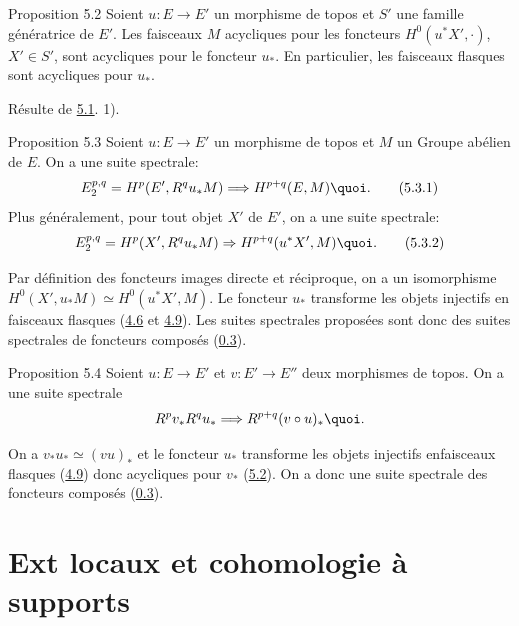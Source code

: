 \begin{enonce*}{Proposition 5.2}
Soient $u : E \to E'$ un morphisme de topos et $S'$ une famille
génératrice de $E'$. Les faisceaux $M$ acycliques pour les
foncteurs $H^{0}(u^\ast X', ⋅)$, $X' \in S'$, sont acycliques pour le
foncteur $u_\ast$. En particulier, les faisceaux flasques sont acycliques
pour $u_\ast$.
\end{enonce*}

Résulte de \hyperref[V.prop5.1]{5.1}. 1).

\begin{enonce*}{Proposition 5.3}
Soient $u : E \to E'$ un morphisme de topos et $M$ un Groupe abélien
de $E$. On a une suite spectrale:
\begin{equation*}
E^{p, q}_2 = H^p(E', R^q u_\ast M) \Longrightarrow H^{p + q} (E,
M){\quoi}.\tag{5.3.1}
\end{equation*}
Plus généralement, pour tout objet $X'$ de $E'$, on a une suite
spectrale:
\begin{equation}
E^{p, q}_2 = H^p(X', R^q u_\ast M) \Rightarrow H^{p + q} (u^\ast X',
M){\quoi}.\tag{5.3.2}
\end{equation}
\end{enonce*}

Par définition des foncteurs images directe et réciproque, on a un
isomorphisme $H^{0} (X', u_\ast M) \simeq H^{0} (u^\ast X', M)$. Le
foncteur $u_\ast$ transforme les objets injectifs en faisceaux flasques
(\hyperref[V.subsec4.6]{4.6} et \hyperref[V.prop4.9]{4.9}). Les suites spectrales proposées sont donc des suites
spectrales de foncteurs composés (\hyperref[V.prop0.3]{0.3}).

\begin{enonce*}{Proposition 5.4}
Soient $u : E \to E'$ et $v : E' \to E''$ deux morphismes de
topos. On a une suite spectrale
$$
R^p v_\ast R^q u_\ast \Longrightarrow R^{p+q} (v \circ u)_\ast {\quoi}.
$$
\end{enonce*}

On a $v_\ast u_\ast \simeq (vu)_\ast$ et le foncteur $u_\ast$
transforme les objets injectifs en\pageoriginale faisceaux flasques
(\hyperref[V.prop4.9]{4.9}) donc acycliques pour $v_\ast$ (\hyperref[V.prop5.2]{5.2}).
On a donc une suite spectrale des foncteurs composés
(\hyperref[V.prop0.3]{0.3}).

\section{Ext locaux et cohomologie à supports}

